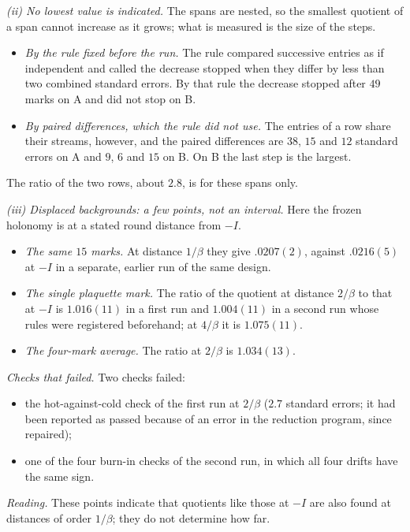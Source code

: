 \emph{{\upshape(ii)} No lowest value is indicated.} The spans are nested, so the smallest quotient of a span
cannot increase as it grows; what is measured is the size of the steps.
\begin{itemize}
\item \emph{By the rule fixed before the run.} The rule compared successive entries as if independent and
called the decrease stopped when they differ by less than two combined standard errors. By that rule the
decrease stopped after $49$ marks on A and did not stop on B.
\item \emph{By paired differences, which the rule did not use.} The entries of a row share their streams,
however, and the paired differences are $38$, $15$ and $12$ standard errors on A and $9$, $6$ and $15$ on B.
On B the last step is the largest.
\end{itemize}
The ratio of the two rows, about $2.8$, is for these spans only.

\emph{{\upshape(iii)} Displaced backgrounds: a few points, not an interval.} Here the frozen holonomy is at a
stated round distance from $-I$.
\begin{itemize}
\item \emph{The same $15$ marks.} At distance $1/\beta$ they give $.0207(2)$, against $.0216(5)$ at $-I$ in a
separate, earlier run of the same design.
\item \emph{The single plaquette mark.} The ratio of the quotient at distance $2/\beta$ to that at $-I$ is
$1.016(11)$ in a first run and $1.004(11)$ in a second run whose rules were registered beforehand; at
$4/\beta$ it is $1.075(11)$.
\item \emph{The four-mark average.} The ratio at $2/\beta$ is $1.034(13)$.
\end{itemize}

\emph{Checks that failed.} Two checks failed:
\begin{itemize}
\item the hot-against-cold check of the first run at $2/\beta$ ($2.7$ standard errors; it had been reported
as passed because of an error in the reduction program, since repaired);
\item one of the four burn-in checks of the second run, in which all four drifts have the same sign.
\end{itemize}

\emph{Reading.} These points indicate that quotients like those at $-I$ are also found at distances of order
$1/\beta$; they do not determine how far.

